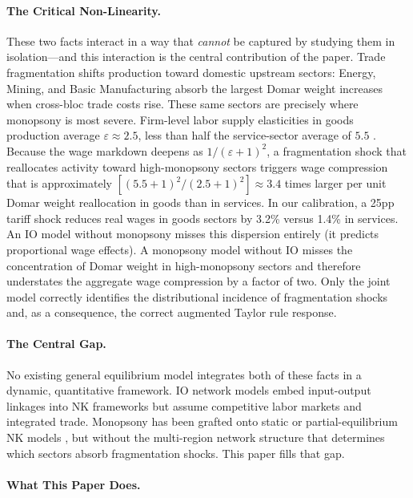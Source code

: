 \paragraph{The Critical Non-Linearity.}
These two facts interact in a way that \emph{cannot} be captured by studying
them in isolation---and this interaction is the central contribution of the
paper. Trade fragmentation shifts production toward domestic upstream sectors:
Energy, Mining, and Basic Manufacturing absorb the largest Domar weight
increases when cross-bloc trade costs rise. These same sectors are precisely
where monopsony is most severe. Firm-level labor supply elasticities in goods
production average $\varepsilon \approx 2.5$, less than half the service-sector
average of $5.5$ \citep{dube2020monopsony}. Because the wage markdown deepens
as $1/(\varepsilon+1)^2$, a fragmentation shock that reallocates activity
toward high-monopsony sectors triggers wage compression that is approximately
$[(5.5+1)^2/(2.5+1)^2] \approx 3.4$ times larger per unit Domar weight
reallocation in goods than in services. In our calibration, a 25pp tariff
shock reduces real wages in goods sectors by 3.2\% versus 1.4\% in services.
An IO model without monopsony misses this dispersion entirely (it predicts
proportional wage effects). A monopsony model without IO misses the
concentration of Domar weight in high-monopsony sectors and
therefore understates the aggregate wage compression by a factor of
two. Only the joint model correctly identifies the distributional incidence of
fragmentation shocks and, as a consequence, the correct augmented Taylor rule
response.

\paragraph{The Central Gap.}
No existing general equilibrium model integrates both of these facts in a
dynamic, quantitative framework. IO network models \citep{baqaee2019,
acemoglu2012} embed input-output linkages into NK frameworks but assume
competitive labor markets and integrated trade. Monopsony has been grafted
onto static or partial-equilibrium NK models \citep{berger2022monopsony,
autor2020fall}, but without the multi-region network structure that determines
which sectors absorb fragmentation shocks. This paper fills that gap.

\paragraph{What This Paper Does.}

